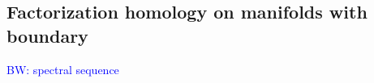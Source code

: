 \documentclass[11pt]{amsart}
\numberwithin{equation}{section}
\def\brian{\textcolor{blue}{BW: }\textcolor{blue}}
\begin{document}
\subsection{Factorization homology on manifolds with boundary}

\brian{spectral sequence}

%
%
%
%
%
%
\end{document}
